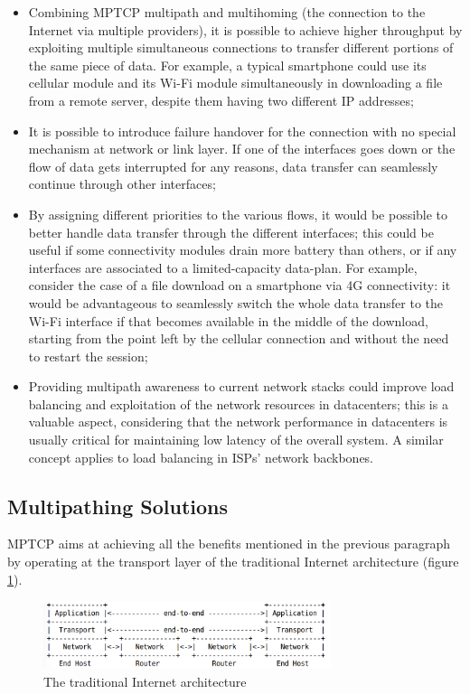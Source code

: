 \begin{itemize}
  \item Combining MPTCP multipath and multihoming (the connection to the Internet via multiple providers), it is possible to achieve higher throughput by exploiting multiple simultaneous connections to transfer different portions of the same piece of data. For example, a typical smartphone could use its cellular module and its Wi-Fi module simultaneously in downloading a file from a remote server, despite them having two different IP addresses;
  \item It is possible to introduce failure handover for the connection with no special mechanism at network or link layer. If one of the interfaces goes down or the flow of data gets interrupted for any reasons, data transfer can seamlessly continue through other interfaces;
  \item By assigning different priorities to the various flows, it would be possible to better handle data transfer through the different interfaces; this could be useful if some connectivity modules drain more battery than others, or if any interfaces are associated to a limited-capacity data-plan. For example, consider the case of a file download on a smartphone via 4G connectivity: it would be advantageous to seamlessly switch the whole data transfer to the Wi-Fi interface if that becomes available in the middle of the download, starting from the point left by the cellular connection and without the need to restart the session;
  \item Providing multipath awareness to current network stacks could improve load balancing and exploitation of the network resources in datacenters; this is a valuable aspect, considering that the network performance in datacenters is usually critical for maintaining low latency of the overall system. A similar concept applies to load balancing in ISPs' network backbones.
\end{itemize}

\subsection{Multipathing Solutions}
\vspace{5mm}
MPTCP aims at achieving all the benefits mentioned in the previous paragraph by operating at the transport layer of the traditional Internet architecture (figure \ref{fig:OSI}).

\begin{figure}[!htb]
\centering
\includegraphics[width=0.75\textwidth]{images/OSI}
\caption{The traditional Internet architecture}
\label{fig:OSI}
\end{figure}

